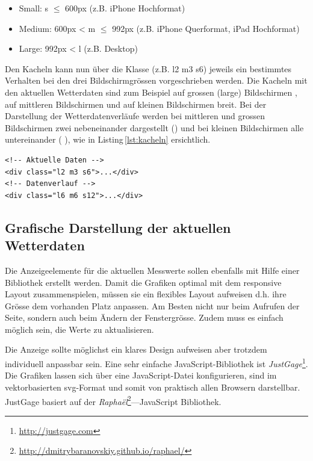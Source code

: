 \begin{itemize}
\item Small: s $\leq$ 600px (z.B. iPhone Hochformat)
\item Medium: 600px < m $\leq$ 992px (z.B. iPhone Querformat, iPad Hochformat)
\item Large: 992px < l (z.B. Desktop)
\end{itemize}

\noindent
Den Kacheln kann nun über die Klasse (z.B. l2 m3 s6) jeweils ein bestimmtes Verhalten bei den drei Bildschirmgrössen vorgeschrieben werden. Die Kacheln mit den aktuellen Wetterdaten sind zum Beispiel auf grossen (large) Bildschirmen , auf mittleren Bildschirmen  und auf kleinen Bildschirmen  breit. Bei der Darstellung der Wetterdatenverläufe werden bei mittleren und grossen Bildschirmen zwei nebeneinander dargestellt () und bei kleinen Bildschirmen alle untereinander ( ), wie in Listing\,\ref{lst:kacheln} ersichtlich.

\vspace{3mm}
\begin{lstlisting}[label=lst:kacheln,caption=Konfiguration der Anzahl Kacheln abhähngig von der Bildschirmgrösse, language=HTML5, style=htmlcssjs]
<!-- Aktuelle Daten -->
<div class="l2 m3 s6">...</div>
<!-- Datenverlauf -->
<div class="l6 m6 s12">...</div>
\end{lstlisting}
\vspace{3mm}

\subsection{Grafische Darstellung der aktuellen Wetterdaten}
Die Anzeigeelemente für die aktuellen Messwerte sollen ebenfalls mit Hilfe einer Bibliothek erstellt werden. Damit die Grafiken optimal mit dem responsive Layout zusammenspielen, müssen sie ein flexibles Layout aufweisen d.h. ihre Grösse dem vorhanden Platz anpassen. Am Besten nicht nur beim Aufrufen der Seite, sondern auch beim Ändern der Fenstergrösse. Zudem muss es einfach möglich sein, die Werte zu aktualisieren.

Die Anzeige sollte möglichst ein klares Design aufweisen aber trotzdem individuell anpassbar sein. Eine sehr einfache JavaScript-Bibliothek ist \textit{JustGage}\footnote{ \url{http://justgage.com}}. Die Grafiken lassen sich über eine JavaScript-Datei konfigurieren, sind im vektorbasierten svg-Format und somit von praktisch allen Browsern darstellbar. JustGage basiert auf der \textit{Raphaël}\footnote{ \url{http://dmitrybaranovskiy.github.io/raphael/}}—JavaScript Bibliothek.

